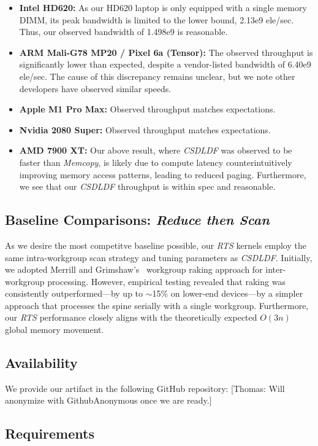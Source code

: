 \documentclass[sigconf]{acmart}
\newcommand{\thomas}[1]{{\footnotesize\color{orange}[Thomas: #1]}}
\begin{document}
\begin{itemize}
  \item \textbf{Intel HD620:} As our HD620 laptop is only equipped with a single memory DIMM, its peak bandwidth is limited to the lower bound, 2.13e9 ele/sec. Thus, our observed bandwidth of 1.498e9 is reasonable.
  \item \textbf{ARM Mali-G78 MP20 / Pixel 6a (Tensor):} The observed throughput is significantly lower than expected, despite a vendor-listed bandwidth of 6.40e9 ele/sec. The cause of this discrepancy remains unclear, but we note other developers have observed similar speeds.
  \item \textbf{Apple M1 Pro Max:} Observed throughput matches expectations.
  \item \textbf{Nvidia 2080 Super:} Observed throughput matches expectations.
  \item \textbf{AMD 7900 XT:} Our above result, where \emph{CSDLDF} was observed to be faster than \emph{Memcopy}, is likely due to compute latency counterintuitively improving memory access patterns, leading to reduced paging. Furthermore, we see that our \emph{CSDLDF} throughput is within spec and reasonable.
\end{itemize}

\subsection{Baseline Comparisons: \emph{Reduce then Scan}}
\label{sec:rts}
As we desire the most competitve baseline possible, our \emph{RTS} kernels employ the same intra-workgroup scan strategy and tuning parameters as \emph{CSDLDF}. Initially, we adopted Merrill and Grimshaw's~\cite{Merrill2009} workgroup raking approach for inter-workgroup processing. However, empirical testing revealed that raking was consistently outperformed—by up to $\sim$15\% on lower-end devices—by a simpler approach that processes the spine serially with a single workgroup. Furthermore, our \emph{RTS} performance closely aligns with the theoretically expected $O(3n)$ global memory movement.

\subsection{Availability}
We provide our artifact in the following GitHub repository:
\thomas{Will anonymize with GithubAnonymous once we are ready.}

\subsection{Requirements}
\end{document}
